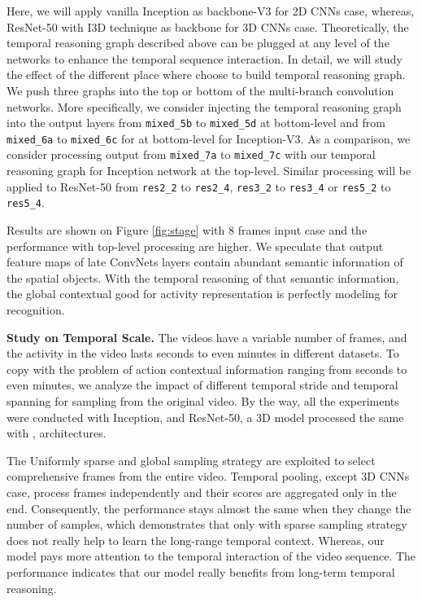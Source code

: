 \documentclass[conference,compsoc]{IEEEtran}
\begin{document}
    Here, we will apply vanilla Inception as backbone-V3 for 2D CNNs case, whereas, ResNet-50 with I3D technique as backbone for 3D CNNs case. Theoretically, the temporal reasoning graph described above can be plugged at any level of the networks to enhance the temporal sequence interaction. In detail, we will study the effect of the different place where choose to build temporal reasoning graph. We push three graphs into the top or bottom of the multi-branch convolution networks. More specifically, we consider injecting the temporal reasoning graph into the output layers from \texttt{mixed\_5b} to \texttt{mixed\_5d} at bottom-level and from \texttt{mixed\_6a} to \texttt{mixed\_6c} for at bottom-level for Inception-V3. As a comparison, we consider processing output from \texttt{mixed\_7a} to \texttt{mixed\_7c} with our temporal reasoning graph for Inception network at the top-level. Similar processing will be applied to ResNet-50 from \texttt{res2\_2} to \texttt{res2\_4}, \texttt{res3\_2} to \texttt{res3\_4} or \texttt{res5\_2} to \texttt{res5\_4}.
    
    
    Results are shown on Figure \ref{fig:stage} with 8 frames input case and the performance with top-level processing are higher. We speculate that output feature maps of late ConvNets layers contain abundant semantic information of the spatial objects. With the temporal reasoning of that semantic information, the global contextual good for activity representation is perfectly modeling for recognition.
    
    
    


    
    \noindent\textbf{Study on Temporal Scale.} The videos have a variable number of frames, and the activity in the video lasts seconds to even minutes in different datasets. To copy with the problem of action contextual information ranging from seconds to even minutes, we analyze the impact of different temporal stride and temporal spanning for sampling from the original video.  By the way, all the experiments were conducted with Inception, and ResNet-50, a 3D model processed the same with \cite{wang2018non}, architectures.
    
    The Uniformly sparse and global sampling strategy are exploited to select comprehensive frames from the entire video. Temporal pooling, except 3D CNNs case, process frames independently and their scores are aggregated only in the end. Consequently, the performance stays almost the same when they change the number of samples, which demonstrates that only with sparse sampling strategy does not really help to learn the long-range temporal context. Whereas, our model pays more attention to the temporal interaction of the video sequence. The performance indicates that our model really benefits from long-term temporal reasoning.
    
\end{document}
